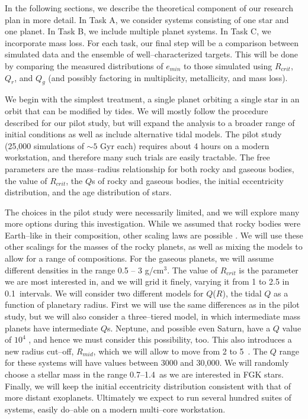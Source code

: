 \medskip
{\centerline{}}
\smallskip

In the following sections, we describe the theoretical component of
our research plan in more detail.  In Task A, we consider systems
consisting of one star and one planet.  In Task B, we include multiple
planet systems. In Task C, we incorporate mass loss.  For each task,
our final step will be a comparison between simulated data and the
ensemble of well--characterized \kepler targets.  This will be done by
comparing the measured distributions of $e_{min}$ to those simulated
using $R_{crit}$, $Q_r$, and $Q_g$ (and possibly factoring in
multiplicity, metallicity, and mass loss).

\medskip
{\centerline{}}
\smallskip

We begin with the simplest treatment, a single planet orbiting a
single star in an orbit that can be modified by tides.  We will mostly
follow the procedure described for our pilot study, but will expand
the analysis to a broader range of initial conditions as well as
include alternative tidal models.  The pilot study (25,000 simulations
of $\sim 5$ Gyr each) requires about 4 hours on a modern workstation,
and therefore many such trials are easily tractable.  The free parameters are the mass--radius
relationship for both rocky and gaseous bodies, the value of
$R_{crit}$, the $Q$s of rocky and gaseous bodies, the initial
eccentricity distribution, and the age distribution of \kepler stars.

The choices in the pilot study were necessarily limited, and we will
explore many more options during this investigation.  While we assumed that
rocky bodies were Earth--like in their composition, other scaling laws
are possible \citep[e.g.][]{Seager07,Fortney07,Lissauer11}.  We will
use these other scalings for the masses of the rocky planets, as well
as mixing the models to allow for a range of compositions.  For the
gaseous planets, we will assume different densities in the range 0.5
-- 3 g/cm$^3$.  The value of $R_{crit}$ is the parameter we are most
interested in, and we will grid it finely, varying it from 1 to 2.5
\rearth in 0.1~\rearth intervals.  We will consider two different
models for $Q$($R$), the tidal $Q$ as a function of planetary radius.
First we will use the same differences as in the pilot study, but we
will also consider a three--tiered model, in which intermediate mass
planets have intermediate $Q$s.  Neptune, and possible even Saturn,
have a $Q$ value of $10^4$ \citep{ZhangHamilton08,Lainey12}, and hence
we must consider this possibility, too.  This also introduces a new
radius cut--off, $R_{mid}$, which we will allow to move from 2 to
5~\rearth.  The $Q$ range for these systems will have values between
3000 and 30,000.  We will randomly choose a stellar mass in the range
0.7--1.4~\msun as we are interested in FGK stars.  Finally, we will
keep the initial eccentricity distribution consistent with that of
more distant exoplanets.  Ultimately we expect to run several hundred
suites of systems, easily do--able on a modern multi--core
workstation.

